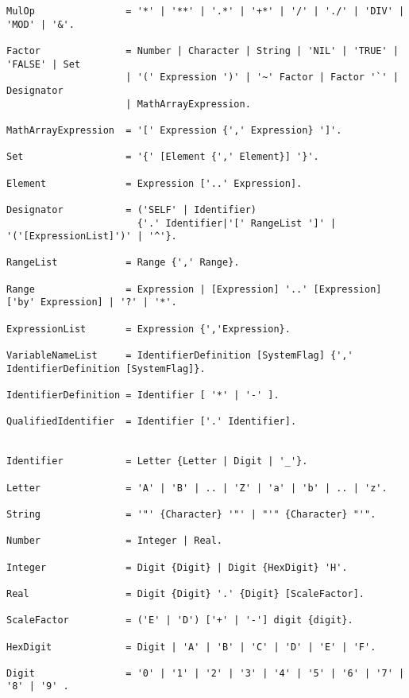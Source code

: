 \documentclass[a4paper,11pt]{article}
\begin{document}
\begin{lstlisting}[language = EBNF, frame=none,xleftmargin=0mm]
MulOp                = '*' | '**' | '.*' | '+*' | '/' | './' | 'DIV' | 'MOD' | '&'.

Factor               = Number | Character | String | 'NIL' | 'TRUE' | 'FALSE' | Set
                     | '(' Expression ')' | '~' Factor | Factor '`' | Designator
                     | MathArrayExpression.

MathArrayExpression  = '[' Expression {',' Expression} ']'.

Set                  = '{' [Element {',' Element}] '}'.

Element              = Expression ['..' Expression].

Designator           = ('SELF' | Identifier)
                       {'.' Identifier|'[' RangeList ']' | '('[ExpressionList]')' | '^'}.

RangeList            = Range {',' Range}.

Range                = Expression | [Expression] '..' [Expression] ['by' Expression] | '?' | '*'.

ExpressionList       = Expression {','Expression}.

VariableNameList     = IdentifierDefinition [SystemFlag] {',' IdentifierDefinition [SystemFlag]}.

IdentifierDefinition = Identifier [ '*' | '-' ].

QualifiedIdentifier  = Identifier ['.' Identifier].


Identifier           = Letter {Letter | Digit | '_'}.

Letter               = 'A' | 'B' | .. | 'Z' | 'a' | 'b' | .. | 'z'.

String               = '"' {Character} '"' | "'" {Character} "'".

Number               = Integer | Real.

Integer              = Digit {Digit} | Digit {HexDigit} 'H'.

Real                 = Digit {Digit} '.' {Digit} [ScaleFactor].

ScaleFactor          = ('E' | 'D') ['+' | '-'] digit {digit}.

HexDigit             = Digit | 'A' | 'B' | 'C' | 'D' | 'E' | 'F'.

Digit                = '0' | '1' | '2' | '3' | '4' | '5' | '6' | '7' | '8' | '9' .

\end{lstlisting}



%
%
%
\end{document}
